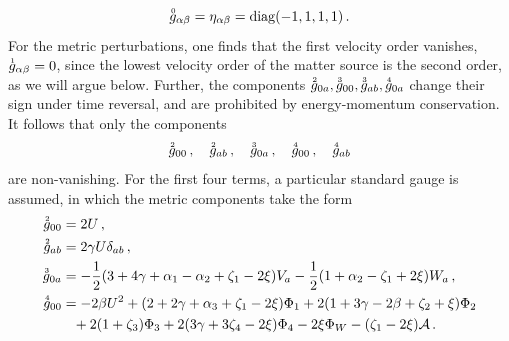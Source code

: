 \documentclass[notitlepage,a4paper,aps,prd,onecolumn,superscriptaddress,nofootinbib,groupedaddress,longbibliography]{revtex4-1}
\newcommand{\order}[2]{\accentset{#2}{#1}}
\begin{document}
\begin{equation}\label{eq:metbkg}
\order{g}{0}_{\alpha\beta} = \eta_{\alpha\beta} = \mathrm{diag}(-1, 1, 1, 1)\,.
\end{equation}
For the metric perturbations, one finds that the first velocity order vanishes, \(\order{g}{1}_{\alpha\beta} = 0\), since the lowest velocity order of the matter source is the second order, as we will argue below. Further, the components \(\order{g}{2}_{0a}, \order{g}{3}_{00}, \order{g}{3}_{ab}, \order{g}{4}_{0a}\) change their sign under time reversal, and are prohibited by energy-momentum conservation. It follows that only the components
\begin{equation}\label{eq:metpert}
\order{g}{2}_{00}\,, \quad
\order{g}{2}_{ab}\,, \quad
\order{g}{3}_{0a}\,, \quad
\order{g}{4}_{00}\,, \quad
\order{g}{4}_{ab}
\end{equation}
are non-vanishing. For the first four terms, a particular standard gauge is assumed, in which the metric components take the form
\begin{subequations}\label{eq:standardppn}
\begin{align}
\order{g}{2}_{00} &= 2U\,,\label{eq:standardppn200}\\
\order{g}{2}_{ab} &= 2\gamma U\delta_{ab}\,,\label{eq:standardppn2ij}\\
\order{g}{3}_{0a} &= -\frac{1}{2}(3 + 4\gamma + \alpha_1 - \alpha_2 + \zeta_1 - 2\xi)V_a - \frac{1}{2}(1 + \alpha_2 - \zeta_1 + 2\xi)W_a\,,\label{eq:standardppn30i}\\
\order{g}{4}_{00} &= -2\beta U^2 + (2 + 2\gamma + \alpha_3 + \zeta_1 - 2\xi)\Phi_1 + 2(1 + 3\gamma - 2\beta + \zeta_2 + \xi)\Phi_2\nonumber\\
&\phantom{=}+ 2(1 + \zeta_3)\Phi_3 + 2(3\gamma + 3\zeta_4 - 2\xi)\Phi_4 - 2\xi\Phi_W - (\zeta_1 - 2\xi)\mathcal{A}\,.\label{eq:standardppn400}
\end{align}
\end{subequations}
\end{document}
